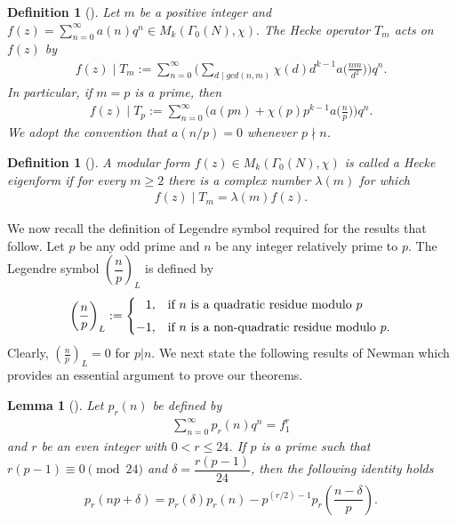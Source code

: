 \documentclass[11pt,a4paper]{article}
\numberwithin{equation}{section}
\theoremstyle{plain}
\newtheorem{lemma}[theorem]{Lemma}
\newtheorem{definition}[theorem]{Definition}
\begin{document}
\begin{definition}[{{\cite[Definition~2.1]{wom}}}]
	Let $m$ be a positive integer and $f(z) = \sum_{n=0}^ \infty a(n)q^n \in  M_k(\Gamma_0(N), \chi ).$ The Hecke operator $T_m$ acts on $f(z)$ by 
	\begin{align}
		f(z)\mid {T_m} := \sum_{n=0}^\infty \bigg( \sum_{d\mid gcd(n,m)} \chi (d) d^{k-1}a \bigg(\frac{nm}{d^2} \bigg) \bigg)q^n.
	\end{align}
	In particular, if $m=p$ is a prime, then 
	\begin{align}\label{2.7}
		f(z)\mid {T_p} := \sum_{n=0}^\infty \bigg( a(pn)+ \chi (p) p^{k-1}a \bigg(\frac{n}{p} \bigg) \bigg)q^n.
	\end{align}
	We adopt the convention that $a(n/p)=0$ whenever $p\nmid n$.
\end{definition}
\begin{definition}[{{\cite[Definition~2.5]{wom}}}] 
A modular form $f(z)\in M_k(\Gamma_0(N), \chi)$ is called a Hecke eigenform if for every $m\ge 2$ there is a complex number $\lambda(m)$ for which
\begin{align}
f(z)\mid T_m=\lambda(m)f(z).
\end{align}
\end{definition}
	We now recall the definition of Legendre symbol required for the results that follow. Let $p$ be any odd prime and $n$ be any integer relatively prime to $p$. The Legendre symbol $\left(\dfrac{n}{p}\right)_L$ is defined by
\[
\left( \frac{n}{p} \right)_L :=
\begin{cases}
	\hphantom{-}1, & \text{if } n \text{ is a quadratic residue modulo }p\\[4pt]
	-1, & \text{if } n \text{ is a non-quadratic residue modulo } p.
\end{cases}
\]
Clearly, $\left(\frac{n}{p}\right)_L=0$ for $p|n$.
We next state the following results of Newman which provides an essential argument to prove our theorems.
\begin{lemma}[{{\cite[Theorem~1]{newman53}}}]\label{lnew53}
	Let $p_r(n)$ be defined by 
	\begin{align*}
		\sum_{n=0}^{\infty} p_r(n)q^n= f_1^r
	\end{align*}
	and $r$ be an even integer with $0<r\le 24$. If $p$ is a prime such that $r(p-1)\equiv 0\pmod {24}$ and $\delta =\dfrac{r(p-1)}{24}$, then the following identity holds
	\begin{align*}
		p_r(np+\delta)=p_r(\delta)p_r(n)-p^{(r/2)-1}p_r\left(\dfrac{n-\delta}{p}\right).
	\end{align*}
\end{lemma}
\end{document}
